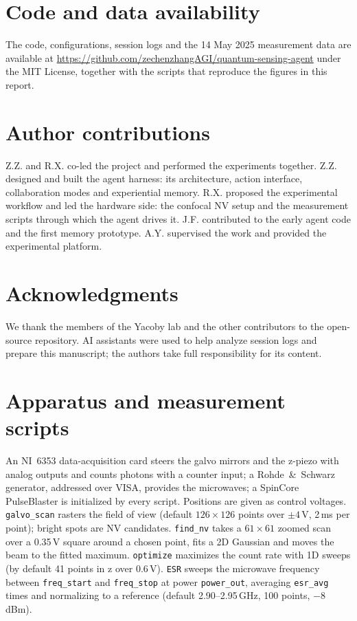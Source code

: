 \documentclass[10pt]{article}
\newcommand{\code}[1]{\texttt{#1}}
\begin{document}
\section*{Code and data availability}
The code, configurations, session logs and the 14 May 2025 measurement data are available at \url{https://github.com/zechenzhangAGI/quantum-sensing-agent} under the MIT License, together with the scripts that reproduce the figures in this report.

\section*{Author contributions}
Z.Z. and R.X. co-led the project and performed the experiments together.
Z.Z. designed and built the agent harness: its architecture, action interface, collaboration modes and experiential memory.
R.X. proposed the experimental workflow and led the hardware side: the confocal NV setup and the measurement scripts through which the agent drives it.
J.F. contributed to the early agent code and the first memory prototype.
A.Y. supervised the work and provided the experimental platform.

\section*{Acknowledgments}
We thank the members of the Yacoby lab and the other contributors to the open-source repository.
AI assistants were used to help analyze session logs and prepare this manuscript; the authors take full responsibility for its content.




\clearpage
\appendix
\sloppy

\section{Apparatus and measurement scripts}
\label{app:apparatus}
An NI~6353 data-acquisition card steers the galvo mirrors and the z-piezo with analog outputs and counts photons with a counter input; a Rohde~\&~Schwarz generator, addressed over VISA, provides the microwaves; a SpinCore PulseBlaster is initialized by every script. Positions are given as control voltages.
\code{galvo\_scan} rasters the field of view (default $126\times126$ points over $\pm4$\,V, 2\,ms per point); bright spots are NV candidates.
\code{find\_nv} takes a $61\times61$ zoomed scan over a 0.35\,V square around a chosen point, fits a 2D Gaussian and moves the beam to the fitted maximum.
\code{optimize} maximizes the count rate with 1D sweeps (by default 41 points in z over 0.6\,V).
\code{ESR} sweeps the microwave frequency between \code{freq\_start} and \code{freq\_stop} at power \code{power\_out}, averaging \code{esr\_avg} times and normalizing to a reference (default 2.90--2.95\,GHz, 100 points, $-8$\,dBm).
\end{document}

